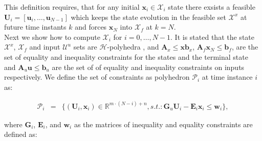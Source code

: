     This definition requires, that for any initial $\textbf{x}_i\in\mathcal{X}_i$ state there exsists a feasible $\textbf{U}_i=[\textbf{u}_i,\dots,\textbf{u}_{N-1}]$ which keeps the state evolution in the feasible set $\mathcal{X}^x$ at future time instants $k$ and forces $\textbf{x}_N$ into $\mathcal{X}_f$ at $k=N$.\\
    Next we show how to compute $\mathcal{X}_i$ for $i=0,\dots,N-1$. It is stated that the state $\mathcal{X}^x$, $\mathcal{X}_f$ and input $\mathcal{U}^u$ sets are $\mathcal{H}$-polyhedra \cite{borrelli2017predictive}, and $\textbf{A}_x\leq\textbf{x}\textbf{b}_x$, $\textbf{A}_f\textbf{x}_N\leq \textbf{b}_f$, are the set of equality and inequality constraints for the states and the terminal state and $\textbf{A}_u\textbf{u}\leq \textbf{b}_u$ are the set of of equality and inequality constraints on inputs respectively. We define the set of constraints as polyhedron $\mathcal{P}_i$ at time instance $i$ as:

    \begin{equation}
        \begin{array}{rcl}
            \mathcal{P}_i&=&\{
            (\textbf{U}_i,\textbf{x}_i)\in\mathbb{R}^{m\cdot(N-i)+n},s.t.:\textbf{G}_u\textbf{U}_i-\textbf{E}_i\textbf{x}_i\leq\textbf{w}_i
            \},
        \end{array}
        \label{BASICMPC:equ:constrained_constraint_set}
    \end{equation}

    where $\textbf{G}_i$, $\textbf{E}_i$, and $\textbf{w}_i$ as the matrices of inequality and equality constraints are defined as:

